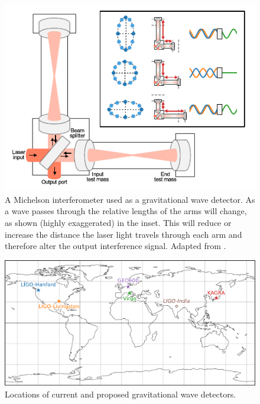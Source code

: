 \begin{colsection}
\begin{colsection}
\begin{figure}[p]
    \begin{center}
        \includegraphics[width=0.75\linewidth]{images/detector.pdf}
    \end{center}
    \caption[A Michelson interferometer used as a gravitational wave detector]{
        A Michelson interferometer used as a gravitational wave detector. As a wave passes through the relative lengths of the arms will change, as shown (highly exaggerated) in the inset. This will reduce or increase the distance the laser light travels through each arm and therefore alter the output interference signal. Adapted from \citet{GW150914_detectors}.
        }\label{fig:detector}
\end{figure}

\begin{figure}[p]
    \begin{center}
        \includegraphics[width=0.95\linewidth]{images/global.pdf}
    \end{center}
    \caption[Locations of gravitational wave detectors]{
        Locations of current and proposed gravitational wave detectors.
        }\label{fig:global}
\end{figure}


\end{colsection}
\end{colsection}
